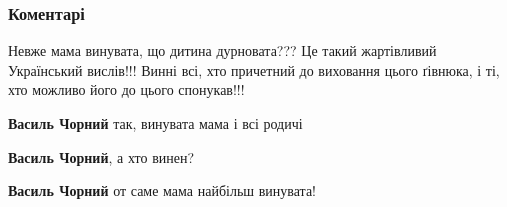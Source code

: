  
 
 
 
 
\subsubsection{Коментарі}

\begin{itemize}
 
Невже мама винувата, що дитина дурновата???
Це такий жартівливий Український вислів!!!
Винні всі, хто причетний до виховання цього ґівнюка, і ті, хто можливо його до цього спонукав!!!

\begin{itemize}
 
\textbf{Василь Чорний} так, винувата мама і всі родичі

 
\textbf{Василь Чорний}, а хто винен?

 
\textbf{Василь Чорний} от саме мама найбільш винувата!

 

\end{itemize}
\end{itemize}
